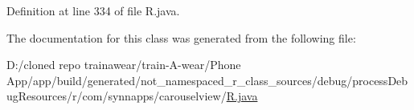 Definition at line 334 of file R.\+java.



The documentation for this class was generated from the following file\+:\begin{DoxyCompactItemize}
\item 
D\+:/cloned repo trainawear/train-\/\+A-\/wear/\+Phone App/app/build/generated/not\+\_\+namespaced\+\_\+r\+\_\+class\+\_\+sources/debug/process\+Debug\+Resources/r/com/synnapps/carouselview/\mbox{\hyperlink{process_debug_resources_2r_2com_2synnapps_2carouselview_2_r_8java}{R.\+java}}\end{DoxyCompactItemize}
